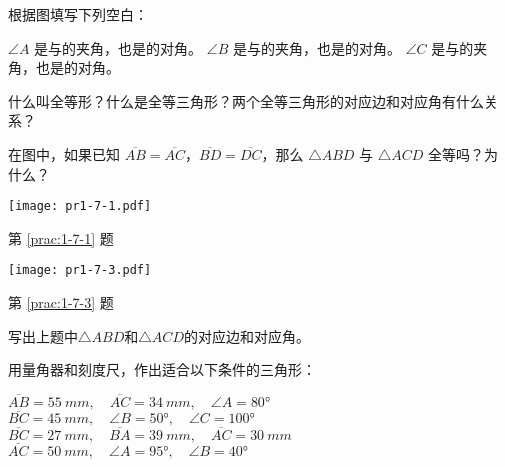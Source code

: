 \begin{Practice}
\begin{question}
	\item\label{prac:1-7-1} 根据图填写下列空白：
	\begin{tasks}
		\task $\angle A$ 是\underline{\qquad }与\underline{\qquad }的夹角，也是\underline{\qquad }的对角。
		\task $\angle B$ 是\underline{\qquad }与\underline{\qquad }的夹角，也是\underline{\qquad }的对角。
		\task $\angle C$ 是\underline{\qquad }与\underline{\qquad }的夹角，也是\underline{\qquad }的对角。
	\end{tasks}
	\item 什么叫全等形？什么是全等三角形？两个全等三角形的对应边和对应角有什么关系？
	\item\label{prac:1-7-3} 在图中，如果已知 $\overline{AB}=\overline{AC}$，$\overline{BD}=\overline{DC}$，那么 $\triangle ABD$ 与 $\triangle ACD$ 全等吗？为什么？
	\begin{figurehere}
		\begin{minipage}[b]{0.48\linewidth}\centering
			\texttt{[image: pr1-7-1.pdf]}
			\caption*{第 \ref{prac:1-7-1} 题}
		\end{minipage}
		\begin{minipage}[b]{0.48\linewidth}\centering
			\texttt{[image: pr1-7-3.pdf]}
			\caption*{第 \ref{prac:1-7-3} 题}
		\end{minipage}
	\end{figurehere}
	\item 写出上题中$\triangle ABD$和$\triangle ACD$的对应边和对应角。
	\item 用量角器和刻度尺，作出适合以下条件的三角形：
	\begin{tasks}
		\task $\overline{AB}=\qty{55}{mm},\quad \overline{AC}=\qty{34}{mm},\quad \angle A=\ang{80}$
		\task $\overline{BC}=\qty{45}{mm},\quad \angle B=\ang{50},\quad \angle C=\ang{100}$
		\task $\overline{BC}=\qty{27}{mm},\quad \overline{BA}=\qty{39}{mm},\quad \overline{AC}=\qty{30}{mm}$
		\task $\overline{AC}=\qty{50}{mm},\quad \angle A=\ang{95},\quad \angle B=\ang{40}$
	\end{tasks}
\end{question}
\end{Practice}

